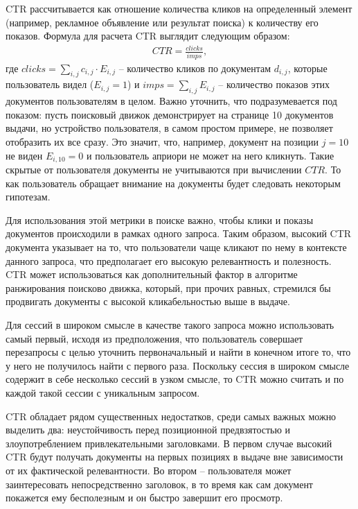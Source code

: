 \documentclass[diploma]{nanolab2015}
\begin{document}
CTR рассчитывается как отношение количества кликов на определенный элемент (например, рекламное объявление или результат поиска) к количеству его показов. Формула для расчета CTR выглядит следующим образом:
\begin{align}
    CTR = \frac{clicks}{imps},
\end{align}
где $clicks = \sum_{i,j} c_{i,j} \cdot E_{i,j}$ -- количество кликов по документам $d_{i,j}$, которые пользователь видел ($E_{i,j}=1$) и $imps = \sum_{i,j}E_{i,j}$ -- количество показов этих документов пользователям в целом. Важно уточнить, что подразумевается под показом: пусть поисковый движок демонстрирует на странице 10 документов выдачи, но устройство пользователя, в самом простом примере, не позволяет отобразить их все сразу. Это значит, что, например, документ на позиции $j=10$ не виден $E_{i,10} = 0$ и пользователь априори не может на него кликнуть. Такие скрытые от пользователя документы не учитываются при вычислении $CTR$. То как пользователь обращает внимание на документы будет следовать некоторым гипотезам.

Для использования этой метрики в поиске важно, чтобы клики и показы документов происходили в рамках одного запроса. Таким образом, высокий CTR документа указывает на то, что пользователи чаще кликают по нему в контексте данного запроса, что предполагает его высокую релевантность и полезность. CTR может использоваться как дополнительный фактор в алгоритме ранжирования поисково движка, который, при прочих равных, стремился бы продвигать документы с высокой кликабельностью выше в выдаче.

Для сессий в широком смысле в качестве такого запроса можно использовать самый первый, исходя из предположения, что пользователь совершает перезапросы с целью уточнить первоначальный и найти в конечном итоге то, что у него не получилось найти с первого раза. Поскольку сессия в широком смысле содержит в себе несколько сессий в узком смысле, то CTR можно считать и по каждой такой сессии с уникальным запросом.

CTR обладает рядом существенных недостатков, среди самых важных можно выделить два: неустойчивость перед позиционной предвзятостью и злоупотреблением привлекательными заголовками. В первом случае высокий CTR будут получать документы на первых позициях в выдаче вне зависимости от их фактической релевантности. Во втором -- пользователя может заинтересовать непосредственно заголовок, в то время как сам документ покажется ему бесполезным и он быстро завершит его просмотр.
\end{document}
